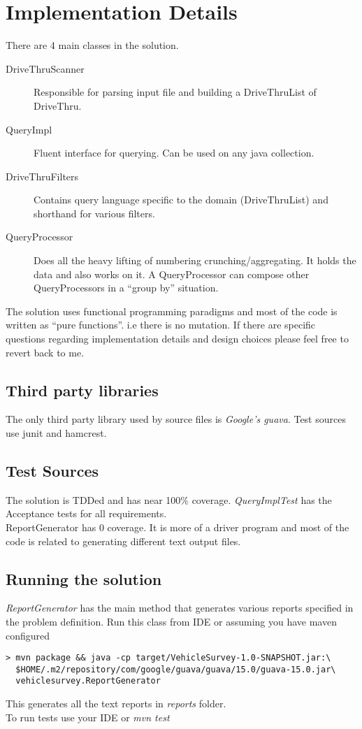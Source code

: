 \documentclass[a4paper]{article}
\begin{document}
\section{Implementation Details}
There are 4 main classes in the solution.

\begin{description}
    \item[DriveThruScanner] Responsible for parsing input file and building a DriveThruList of DriveThru.
    \item[QueryImpl] Fluent interface for querying. Can be used on any java collection.
    \item[DriveThruFilters] Contains query language specific to the domain (DriveThruList) and shorthand for various filters.
    \item[QueryProcessor] Does all the heavy lifting of numbering crunching/aggregating. It holds the data and also works on it. A QueryProcessor can compose other QueryProcessors in a ``group by'' situation.
\end{description}

The solution uses functional programming paradigms and most of the code is written as ``pure functions''. i.e there is no mutation. If there are specific questions regarding implementation details and design choices please feel free to revert back to me.

\subsection{Third party libraries}
The only third party library used by source files is \emph{Google's guava}. Test sources use junit and hamcrest.

\subsection{Test Sources}
The solution is TDDed and has near 100\% coverage. \emph{QueryImplTest} has the Acceptance tests for all requirements.\\ 
ReportGenerator has 0 coverage. It is more of a driver program and most of the code is related to generating different text output files.

\subsection{Running the solution}
\emph{ReportGenerator} has the main method that generates various reports specified in the problem definition. Run this class from IDE or assuming you have maven configured 
\begin{verbatim}
> mvn package && java -cp target/VehicleSurvey-1.0-SNAPSHOT.jar:\
  $HOME/.m2/repository/com/google/guava/guava/15.0/guava-15.0.jar\
  vehiclesurvey.ReportGenerator
\end{verbatim}
This generates all the text reports in \emph{reports} folder.\\
To run tests use your IDE or \emph{mvn test}
 
\end{document}
